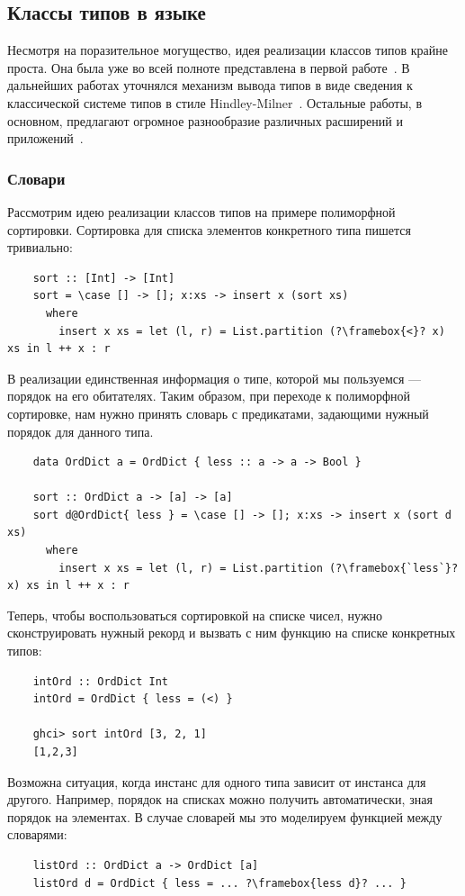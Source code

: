 \subsection{Классы типов в языке}

Несмотря на поразительное могущество, идея реализации классов типов крайне проста.
Она была уже во всей полноте представлена в первой работе~\cite{wadler1989make}.
В дальнейших работах уточнялся механизм вывода типов в виде сведения к классической системе типов в стиле Hindley-Milner~\cite{hall1996type}.
Остальные работы, в основном, предлагают огромное разнообразие различных расширений и приложений~\cite{jones1997type}.

\subsubsection{Словари} \label{subsubsec:tc-dict}

Рассмотрим идею реализации классов типов на примере полиморфной сортировки.
Сортировка для списка элементов конкретного типа пишется тривиально:
\begin{verbatim}
    sort :: [Int] -> [Int]
    sort = \case [] -> []; x:xs -> insert x (sort xs)
      where
        insert x xs = let (l, r) = List.partition (?\framebox{<}? x) xs in l ++ x : r
\end{verbatim}

В реализации единственная информация о типе, которой мы пользуемся --- порядок на его обитателях.
Таким образом, при переходе к полиморфной сортировке, нам нужно принять словарь с предикатами, задающими нужный порядок для данного типа.
\begin{verbatim}
    data OrdDict a = OrdDict { less :: a -> a -> Bool }

    sort :: OrdDict a -> [a] -> [a]
    sort d@OrdDict{ less } = \case [] -> []; x:xs -> insert x (sort d xs)
      where
        insert x xs = let (l, r) = List.partition (?\framebox{`less`}? x) xs in l ++ x : r
\end{verbatim}

Теперь, чтобы воспользоваться сортировкой на списке чисел, нужно сконструировать нужный рекорд и вызвать с ним функцию на списке конкретных типов:
\begin{verbatim}
    intOrd :: OrdDict Int
    intOrd = OrdDict { less = (<) }

    ghci> sort intOrd [3, 2, 1]
    [1,2,3]
\end{verbatim}

Возможна ситуация, когда инстанс для одного типа зависит от инстанса для другого.
Например, порядок на списках можно получить автоматически, зная порядок на элементах.
В случае словарей мы это моделируем функцией между словарями:
\begin{verbatim}
    listOrd :: OrdDict a -> OrdDict [a]
    listOrd d = OrdDict { less = ... ?\framebox{less d}? ... }
\end{verbatim}

